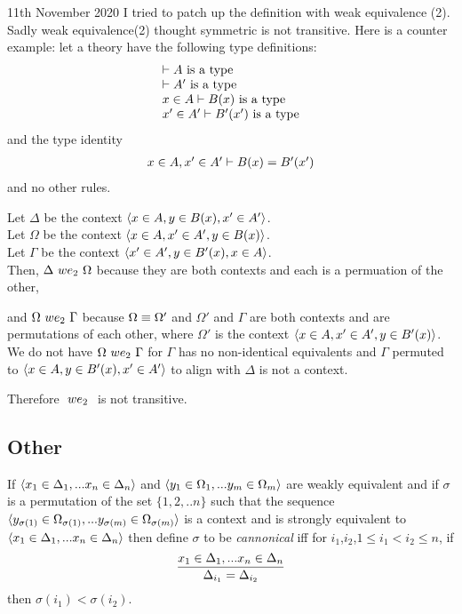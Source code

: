 \documentclass[10pt,a4paper]{scrartcl}
\begin{document}
\begin{framed}
11th November 2020 I tried to patch up the definition with weak equivalence (2).
Sadly weak equivalence(2) thought symmetric is not transitive. Here is a counter example:
let a theory have the following type definitions:
\begin{displaymath}
\begin{array}{l}
\vdash A\mbox{ is a type} \\
\vdash A'\mbox{ is a type} \\
x \in A\vdash B(x)\mbox{ is a type} \\
x' \in A'\vdash B'(x')\mbox{ is a type}
\end{array}
\end{displaymath}
and the type identity
\begin{displaymath}
\begin{array}{l}
x \in A, x' \in A'\vdash B(x)=B'(x')
\end{array}
\end{displaymath}
and no other rules.

Let $\Delta$ be the context $\langle x \in A, y \in B(x), x' \in A'\rangle$. \\

Let $\Omega$ be the context $\langle x \in A, x' \in A', y \in B(x)\rangle$. \\

Let $\Gamma$ be the context $\langle x' \in A', y \in B'(x),  x \in A\rangle$. \\

Then, $\Delta\ we_2\ \Omega$ because they are both contexts and each is a permuation of the other,

and $\Omega\ we_2\ \Gamma$ because $\Omega \equiv \Omega'$ and $\Omega'$ and $\Gamma$ are both contexts and are permutations of each other,
where $\Omega'$ is the context $\langle x \in A, x' \in A', y \in B'(x)\rangle$. \\

We do not have $\Omega\ we_2\ \Gamma$ for $\Gamma$ has no non-identical equivalents and $\Gamma$ permuted to 
$\langle x \in A, y \in B'(x), x' \in A'\rangle$ to align with $\Delta$ is not a context.
 
Therefore $\ we_2\ $ is not transitive.
\end{framed}
\subsection{Other}
\noindent 
If $\langle x_1 \in \Delta_1,... x_{n} \in \Delta_{n}\rangle$ 
and $\langle y_1 \in \Omega_1,... y_{m} \in \Omega_{m}\rangle$ are weakly equivalent 
and if $\sigma$ is a permutation of the set $\{1,2,..n\}$
such that the sequence 
$\langle y_{\sigma(1)} \in \Omega_{\sigma(1)},... y_{\sigma(m)} \in \Omega_{\sigma(m)}\rangle$
is a context and 
is strongly equivalent to $\langle x_1 \in \Delta_1,... x_{n} \in \Delta_{n}\rangle$
then define $\sigma$ to be \textit{cannonical} iff
for $i_1$,$i_2$,$1 \leq i_1  < i_2 \leq n$, if 
$$
\frac{x_1 \in \Delta_1,... x_{n} \in \Delta_{n}}{\Delta_{i_1}=\Delta_{i_2}}
$$
then $\sigma(i_1) < \sigma(i_2)$.\\
\end{document}
